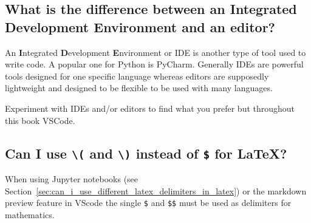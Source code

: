 \subsection{What is the difference between an Integrated Development Environment and an editor?}
\label{\detokenize{building-tools/04-editor-and-cli/why/main:what-is-the-difference-between-an-integrated-development-environment-and-an-editor}}

An \textbf{I}ntegrated \textbf{D}evelopment \textbf{E}nvironment or IDE is another type of tool used
to write code. A popular one for Python is PyCharm.
Generally IDEs are powerful tools designed for one specific language whereas
editors are supposedly lightweight and designed to be flexible to be used with
many languages.


Experiment with IDEs and/or editors to find what you prefer but
throughout this book VSCode.


\subsection{Can I use \texttt{\textbackslash(} and \texttt{\textbackslash)} instead of \texttt{\$} for \LaTeX?}

When using Jupyter notebooks (see Section~\ref{sec:can_i_use_different_latex_delimiters_in_latex}) or the markdown preview feature in VScode the
single \texttt{\$} and \texttt{\$\$} must be used as delimiters for mathematics.
